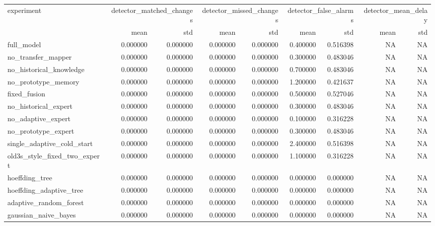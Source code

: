 \begin{tabular}{lrrrrrrrr}
\toprule
experiment & \multicolumn{2}{r}{detector\_matched\_changes} & \multicolumn{2}{r}{detector\_missed\_changes} & \multicolumn{2}{r}{detector\_false\_alarms} & \multicolumn{2}{r}{detector\_mean\_delay} \\
 & mean & std & mean & std & mean & std & mean & std \\
\midrule
full\_model & 0.000000 & 0.000000 & 0.000000 & 0.000000 & 0.400000 & 0.516398 & NA & NA \\
no\_transfer\_mapper & 0.000000 & 0.000000 & 0.000000 & 0.000000 & 0.300000 & 0.483046 & NA & NA \\
no\_historical\_knowledge & 0.000000 & 0.000000 & 0.000000 & 0.000000 & 0.700000 & 0.483046 & NA & NA \\
no\_prototype\_memory & 0.000000 & 0.000000 & 0.000000 & 0.000000 & 1.200000 & 0.421637 & NA & NA \\
fixed\_fusion & 0.000000 & 0.000000 & 0.000000 & 0.000000 & 0.500000 & 0.527046 & NA & NA \\
no\_historical\_expert & 0.000000 & 0.000000 & 0.000000 & 0.000000 & 0.300000 & 0.483046 & NA & NA \\
no\_adaptive\_expert & 0.000000 & 0.000000 & 0.000000 & 0.000000 & 0.100000 & 0.316228 & NA & NA \\
no\_prototype\_expert & 0.000000 & 0.000000 & 0.000000 & 0.000000 & 0.300000 & 0.483046 & NA & NA \\
single\_adaptive\_cold\_start & 0.000000 & 0.000000 & 0.000000 & 0.000000 & 2.400000 & 0.516398 & NA & NA \\
old3s\_style\_fixed\_two\_expert & 0.000000 & 0.000000 & 0.000000 & 0.000000 & 1.100000 & 0.316228 & NA & NA \\
hoeffding\_tree & 0.000000 & 0.000000 & 0.000000 & 0.000000 & 0.000000 & 0.000000 & NA & NA \\
hoeffding\_adaptive\_tree & 0.000000 & 0.000000 & 0.000000 & 0.000000 & 0.000000 & 0.000000 & NA & NA \\
adaptive\_random\_forest & 0.000000 & 0.000000 & 0.000000 & 0.000000 & 0.000000 & 0.000000 & NA & NA \\
gaussian\_naive\_bayes & 0.000000 & 0.000000 & 0.000000 & 0.000000 & 0.000000 & 0.000000 & NA & NA \\
\bottomrule
\end{tabular}
